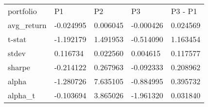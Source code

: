 \begin{tabular}{lllll}
\toprule
\midrule
portfolio & P1 & P2 & P3 & P3 - P1 \\
avg_return & -0.024995 & 0.006045 & -0.000426 & 0.024569 \\
t-stat & -1.192179 & 1.491953 & -0.514090 & 1.163454 \\
stdev & 0.116734 & 0.022560 & 0.004615 & 0.117577 \\
sharpe & -0.214122 & 0.267963 & -0.092333 & 0.208962 \\
alpha & -1.280726 & 7.635105 & -0.884995 & 0.395732 \\
alpha_t & -0.103694 & 3.865026 & -1.961320 & 0.031840 \\
\bottomrule
\end{tabular}
